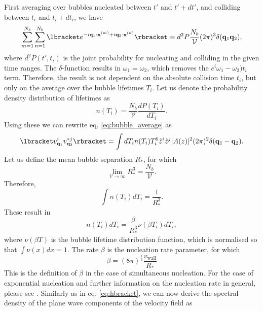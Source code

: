 First averaging over bubbles nucleated between $t'$ and $t' + dt'$, and colliding between $t_i$ and $t_i + dt_i$, we have
\begin{equation}
\sum_{m=1}^{N_b} \sum_{n=1}^{N_b} \lbracket e^{-i \mathbf{q}_1 \cdot \mathbf{x}^{(m)} + i \mathbf{q}_2 \cdot \mathbf{x}^{(n)}} \rbracket
= d^2 P \frac{N_b}{\mathcal{V}} (2\pi)^3 \delta(\mathbf{q}_1 \mathbf{q}_2),
\label{eq:bubble_average}
\end{equation}
where $d^2 P(t', t_i)$ is the joint probability for nucleating and colliding in the given time ranges.
The $\delta$-function results in $\omega_1 = \omega_2$, which removes the $e^i{\omega_1 - \omega_2)t_i}$ term.
Therefore, the result is not dependent on the absolute collision time $t_i$,
but only on the average over the bubble lifetimes $T_i$.
Let us denote the probability density distribution of lifetimes as
\begin{equation}
n(T_i) = \frac{N_b}{\mathcal{V}} \frac{dP(T_i)}{dT_i}.
\end{equation}
Using these we can rewrite eq. \eqref{eq:bubble_average} as
\begin{equation}
\lbracket v_{\mathbf{q}_1}^i v_{\mathbf{q}_2}^{*j} \rbracket = \int dT_i n(T_i) T_i^6 \hat{z}^i \hat{z}^j |A(z)|^2 (2\pi)^2 \delta(\mathbf{q}_1 - \mathbf{q}_2).
\end{equation}
Let us define the mean bubble separation $R_*$, for which
\begin{equation}
\lim_{\mathcal{V}\rightarrow\infty} R_*^3 = \frac{N_b}{\mathcal{V}}.
\end{equation}
Therefore,
\begin{equation}
\int n(T_i) dT_i = \frac{1}{R_*^3}.
\end{equation}
These result in
\begin{equation}
n(T_i) dT_i = \frac{\beta}{R_*^3} \nu(\beta T_i) dT_i,
\end{equation}
where $\nu (\beta T)$ is the bubble lifetime distribution function, which is normalised so that $\int \nu(x) dx = 1$.
The rate $\beta$ is the nucleation rate parameter, for which
\begin{equation}
\beta = (8 \pi)^{\frac{1}{3}} \frac{v_\text{wall}}{R_*}
\end{equation}
This is the definition of $\beta$ in the case of simultaneous nucleation.
For the case of exponential nucleation and further information on the nucleation rate in general,
please see \cite[section 4.2]{hindmarsh_gw_pt_2019}.
Similarly as in eq. \eqref{eq:hbracket}, we can now derive the spectral density of the plane wave components of the velocity field as
